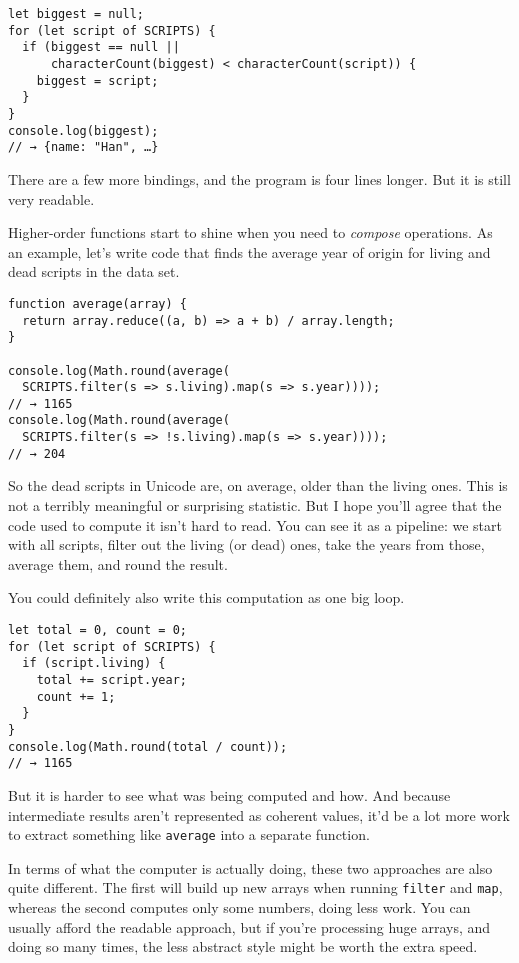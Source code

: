 \begin{lstlisting}
let biggest = null;
for (let script of SCRIPTS) {
  if (biggest == null ||
      characterCount(biggest) < characterCount(script)) {
    biggest = script;
  }
}
console.log(biggest);
// → {name: "Han", …}
\end{lstlisting}
\noindent

There are a few more bindings, and the program is four lines longer. But it is still very readable.

\label{higher_order.average_function}Higher-order functions start to shine when you need to \emph{compose} operations. As an example, let's write code that finds the average year of origin for living and dead scripts in the data set.

\begin{lstlisting}
function average(array) {
  return array.reduce((a, b) => a + b) / array.length;
}

console.log(Math.round(average(
  SCRIPTS.filter(s => s.living).map(s => s.year))));
// → 1165
console.log(Math.round(average(
  SCRIPTS.filter(s => !s.living).map(s => s.year))));
// → 204
\end{lstlisting}
\noindent

So the dead scripts in Unicode are, on average, older than the living ones. This is not a terribly meaningful or surprising statistic. But I hope you'll agree that the code used to compute it isn't hard to read. You can see it as a pipeline: we start with all scripts, filter out the living (or dead) ones, take the years from those, average them, and round the result.

You could definitely also write this computation as one big loop.

\begin{lstlisting}
let total = 0, count = 0;
for (let script of SCRIPTS) {
  if (script.living) {
    total += script.year;
    count += 1;
  }
}
console.log(Math.round(total / count));
// → 1165
\end{lstlisting}
\noindent

But it is harder to see what was being computed and how. And because intermediate results aren't represented as coherent values, it'd be a lot more work to extract something like \lstinline`average` into a separate function.

In terms of what the computer is actually doing, these two approaches are also quite different. The first will build up new arrays when running \lstinline`filter` and \lstinline`map`, whereas the second computes only some numbers, doing less work. You can usually afford the readable approach, but if you're processing huge arrays, and doing so many times, the less abstract style might be worth the extra speed.

